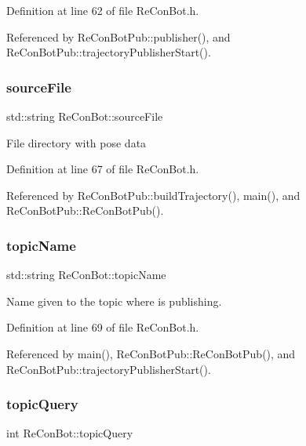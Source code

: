 Definition at line 62 of file Re\+Con\+Bot.\+h.



Referenced by Re\+Con\+Bot\+Pub\+::publisher(), and Re\+Con\+Bot\+Pub\+::trajectory\+Publisher\+Start().

\mbox{\label{class_re_con_bot_a65cf4bed9bbabd92e1265d05507e0945}} 
\subsubsection{\texorpdfstring{source\+File}{sourceFile}}
{\footnotesize\ttfamily std\+::string Re\+Con\+Bot\+::source\+File}

File directory with pose data 

Definition at line 67 of file Re\+Con\+Bot.\+h.



Referenced by Re\+Con\+Bot\+Pub\+::build\+Trajectory(), main(), and Re\+Con\+Bot\+Pub\+::\+Re\+Con\+Bot\+Pub().

\mbox{\label{class_re_con_bot_a1d91d2ea8c0f16340440357906fb9ebf}} 
\subsubsection{\texorpdfstring{topic\+Name}{topicName}}
{\footnotesize\ttfamily std\+::string Re\+Con\+Bot\+::topic\+Name}

Name given to the topic where is publishing. 

Definition at line 69 of file Re\+Con\+Bot.\+h.



Referenced by main(), Re\+Con\+Bot\+Pub\+::\+Re\+Con\+Bot\+Pub(), and Re\+Con\+Bot\+Pub\+::trajectory\+Publisher\+Start().

\mbox{\label{class_re_con_bot_aba20d307ac1b2e6b22f96da83a0d937d}} 
\subsubsection{\texorpdfstring{topic\+Query}{topicQuery}}
{\footnotesize\ttfamily int Re\+Con\+Bot\+::topic\+Query\hspace{0.3cm}{\ttfamily [protected]}}



